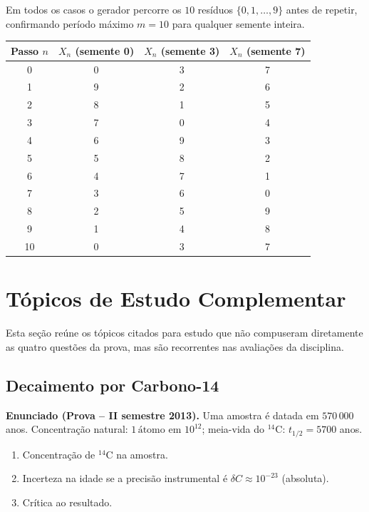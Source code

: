 \documentclass[12pt,a4paper]{article}
\theoremstyle{definition}
\begin{document}
Em todos os casos o gerador percorre os $10$ res\'iduos $\{0,1,\ldots,9\}$ antes de repetir,
confirmando per\'iodo m\'aximo $m = 10$ para qualquer semente inteira.

\begin{center}
\begin{tabular}{cccc}
\toprule
Passo $n$ & $X_n$ (semente 0) & $X_n$ (semente 3) & $X_n$ (semente 7) \\
\midrule
0 & 0 & 3 & 7 \\
1 & 9 & 2 & 6 \\
2 & 8 & 1 & 5 \\
3 & 7 & 0 & 4 \\
4 & 6 & 9 & 3 \\
5 & 5 & 8 & 2 \\
6 & 4 & 7 & 1 \\
7 & 3 & 6 & 0 \\
8 & 2 & 5 & 9 \\
9 & 1 & 4 & 8 \\
10 & 0 & 3 & 7 \\
\bottomrule
\end{tabular}
\end{center}

\newpage
\section{T\'opicos de Estudo Complementar}

Esta se\c{c}\~ao re\'une os t\'opicos citados para estudo que n\~ao compuseram diretamente
as quatro quest\~oes da prova, mas s\~ao recorrentes nas avalia\c{c}\~oes da disciplina.

\subsection{Deca\-imento por Carbono-14}

\textbf{Enunciado (Prova -- II\textordmasculine{} semestre 2013).}
Uma amostra \'e datada em $570\,000$ anos. Concentra\c{c}\~ao natural: $1\,\text{\'atomo em }10^{12}$;
meia-vida do ${}^{14}$C: $t_{1/2} = 5700$ anos.
\begin{enumerate}[label=\alph*)]
  \item Concentra\c{c}\~ao de ${}^{14}$C na amostra.
  \item Incerteza na idade se a precis\~ao instrumental \'e $\delta C \approx 10^{-23}$ (absoluta).
  \item Cr\'itica ao resultado.
\end{enumerate}
\end{document}
